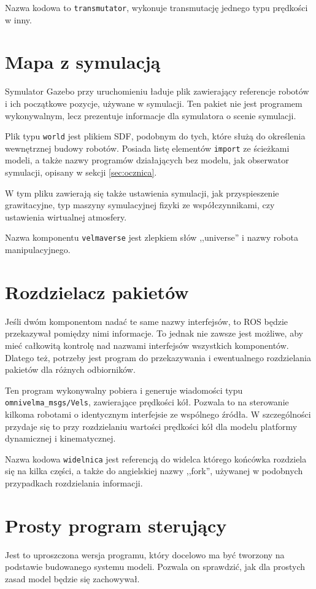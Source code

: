 	Nazwa kodowa to \texttt{transmutator}, wykonuje transmutację jednego typu prędkości w inny.
	
\section{Mapa z symulacją}
	Symulator Gazebo przy uruchomieniu ładuje plik zawierający referencje robotów i ich początkowe pozycje, używane w symulacji.
	Ten pakiet nie jest programem wykonywalnym, lecz prezentuje informacje dla symulatora o scenie symulacji.
	
	Plik typu \texttt{world} jest plikiem SDF, podobnym do tych, które służą do określenia wewnętrznej budowy robotów.
	Posiada listę elementów \texttt{import} ze ścieżkami modeli, a także nazwy programów działających bez modelu, jak obserwator symulacji, opisany w sekcji \ref{sec:ocznica}.

	W tym pliku zawierają się także ustawienia symulacji, jak przyspieszenie grawitacyjne, typ maszyny symulacyjnej fizyki ze współczynnikami, czy ustawienia wirtualnej atmosfery.
	
	Nazwa komponentu \texttt{velmaverse} jest zlepkiem słów ,,universe'' i nazwy robota manipulacyjnego.
	
\section{Rozdzielacz pakietów}
	Jeśli dwóm komponentom nadać te same nazwy interfejsów, to ROS będzie przekazywał pomiędzy nimi informacje.
	To jednak nie zawsze jest możliwe, aby mieć całkowitą kontrolę nad nazwami interfejsów wszystkich komponentów.
	Dlatego też, potrzeby jest program do przekazywania i ewentualnego rozdzielania pakietów dla różnych odbiorników.
	
	Ten program wykonywalny pobiera i generuje wiadomości typu \texttt{omnivelma\_msgs/Vels}, zawierające prędkości kół.
	Pozwala to na sterowanie kilkoma robotami o identycznym interfejsie ze wspólnego źródła.
	W szczególności przydaje się to przy rozdzielaniu wartości prędkości kół dla modelu platformy dynamicznej i kinematycznej.
	
	Nazwa kodowa \texttt{widelnica} jest referencją do widelca którego końcówka rozdziela się na kilka części, a także do angielskiej nazwy ,,fork'', używanej w podobnych 
	przypadkach rozdzielania informacji.
	
\section{Prosty program sterujący}
	Jest to uproszczona wersja programu, który docelowo ma być tworzony na podstawie budowanego systemu modeli.
	Pozwala on sprawdzić, jak dla prostych zasad model będzie się zachowywał.
	
